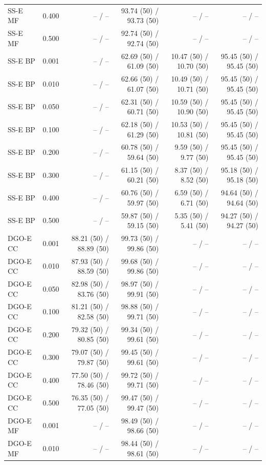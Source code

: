 \begin{longtable}{lrrrrr}
SS-E MF & 0.400 & -- / -- & 93.74 (50) / 93.73 (50) & -- / -- & -- / -- \\
SS-E MF & 0.500 & -- / -- & 92.74 (50) / 92.74 (50) & -- / -- & -- / -- \\
SS-E BP & 0.001 & -- / -- & 62.69 (50) / 61.09 (50) & 10.47 (50) / 10.70 (50) & 95.45 (50) / 95.45 (50) \\
SS-E BP & 0.010 & -- / -- & 62.66 (50) / 61.07 (50) & 10.49 (50) / 10.71 (50) & 95.45 (50) / 95.45 (50) \\
SS-E BP & 0.050 & -- / -- & 62.31 (50) / 60.71 (50) & 10.59 (50) / 10.90 (50) & 95.45 (50) / 95.45 (50) \\
SS-E BP & 0.100 & -- / -- & 62.18 (50) / 61.29 (50) & 10.53 (50) / 10.81 (50) & 95.45 (50) / 95.45 (50) \\
SS-E BP & 0.200 & -- / -- & 60.78 (50) / 59.64 (50) & 9.59 (50) / 9.77 (50) & 95.45 (50) / 95.45 (50) \\
SS-E BP & 0.300 & -- / -- & 61.15 (50) / 60.21 (50) & 8.37 (50) / 8.52 (50) & 95.18 (50) / 95.18 (50) \\
SS-E BP & 0.400 & -- / -- & 60.76 (50) / 59.97 (50) & 6.59 (50) / 6.71 (50) & 94.64 (50) / 94.64 (50) \\
SS-E BP & 0.500 & -- / -- & 59.87 (50) / 59.15 (50) & 5.35 (50) / 5.41 (50) & 94.27 (50) / 94.27 (50) \\
DGO-E CC & 0.001 & 88.21 (50) / 88.89 (50) & 99.73 (50) / 99.86 (50) & -- / -- & -- / -- \\
DGO-E CC & 0.010 & 87.93 (50) / 88.59 (50) & 99.68 (50) / 99.86 (50) & -- / -- & -- / -- \\
DGO-E CC & 0.050 & 82.98 (50) / 83.76 (50) & 98.97 (50) / 99.91 (50) & -- / -- & -- / -- \\
DGO-E CC & 0.100 & 81.21 (50) / 82.58 (50) & 98.88 (50) / 99.71 (50) & -- / -- & -- / -- \\
DGO-E CC & 0.200 & 79.32 (50) / 80.85 (50) & 99.34 (50) / 99.61 (50) & -- / -- & -- / -- \\
DGO-E CC & 0.300 & 79.07 (50) / 79.87 (50) & 99.45 (50) / 99.61 (50) & -- / -- & -- / -- \\
DGO-E CC & 0.400 & 77.50 (50) / 78.46 (50) & 99.72 (50) / 99.71 (50) & -- / -- & -- / -- \\
DGO-E CC & 0.500 & 76.35 (50) / 77.05 (50) & 99.47 (50) / 99.47 (50) & -- / -- & -- / -- \\
DGO-E MF & 0.001 & -- / -- & 98.49 (50) / 98.66 (50) & -- / -- & -- / -- \\
DGO-E MF & 0.010 & -- / -- & 98.44 (50) / 98.61 (50) & -- / -- & -- / -- \\

\end{longtable}
